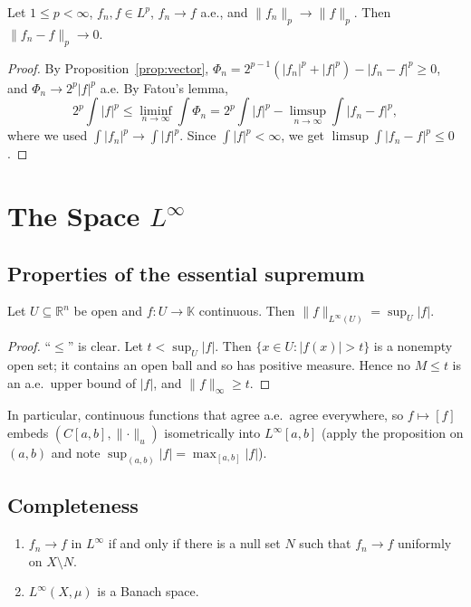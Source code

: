 \documentclass[11pt]{article}
\newcommand{\K}{\mathbb{K}}
\newcommand{\R}{\mathbb{R}}
\newcommand{\norm}[1]{\lVert #1\rVert}
\begin{document}
\begin{proposition}\label{prop:riesz-scheffe}
Let $1\le p<\infty$, $f_{n},f\in L^{p}$, $f_{n}\to f$ a.e., and $\norm{f_{n}}_{p}\to\norm{f}_{p}$. Then $\norm{f_{n}-f}_{p}\to0$.
\end{proposition}

\begin{proof}
By Proposition~\ref{prop:vector}, $\Phi_{n}=2^{p-1}(|f_{n}|^{p}+|f|^{p})-|f_{n}-f|^{p}\ge0$, and $\Phi_{n}\to2^{p}|f|^{p}$ a.e. By Fatou's lemma,
\[
2^{p}\int|f|^{p}\le\liminf_{n\to\infty}\int\Phi_{n}=2^{p}\int|f|^{p}-\limsup_{n\to\infty}\int|f_{n}-f|^{p},
\]
where we used $\int|f_{n}|^{p}\to\int|f|^{p}$. Since $\int|f|^{p}<\infty$, we get $\limsup\int|f_{n}-f|^{p}\le0$.
\end{proof}

\section{The Space $L^{\infty}$}

\subsection{Properties of the essential supremum}

\begin{proposition}\label{prop:cont-esssup}
Let $U\subseteq\R^{n}$ be open and $f:U\to\K$ continuous. Then $\norm{f}_{L^{\infty}(U)}=\sup_{U}|f|$.
\end{proposition}

\begin{proof}
``$\le$'' is clear. Let $t<\sup_{U}|f|$. Then $\{x\in U:|f(x)|>t\}$ is a nonempty open set; it contains an open ball and so has positive measure. Hence no $M\le t$ is an a.e.\ upper bound of $|f|$, and $\norm{f}_{\infty}\ge t$.
\end{proof}

In particular, continuous functions that agree a.e.\ agree everywhere, so $f\mapsto[f]$ embeds $(C[a,b],\norm{\cdot}_{u})$ isometrically into $L^{\infty}[a,b]$ (apply the proposition on $(a,b)$ and note $\sup_{(a,b)}|f|=\max_{[a,b]}|f|$).

\subsection{Completeness}

\begin{theorem}\label{thm:Linfty-complete}
\begin{enumerate}
\item $f_{n}\to f$ in $L^{\infty}$ if and only if there is a null set $N$ such that $f_{n}\to f$ uniformly on $X\setminus N$.
\item $L^{\infty}(X,\mu)$ is a Banach space.
\end{enumerate}
\end{theorem}
\end{document}
